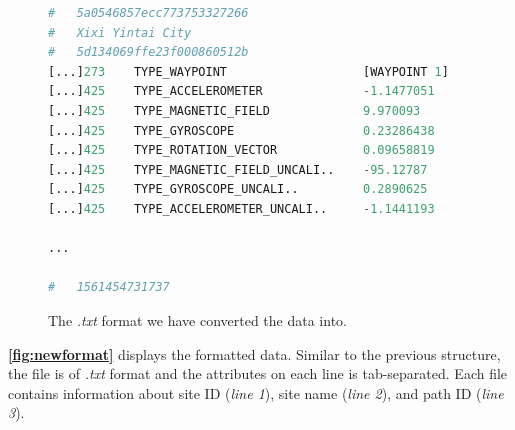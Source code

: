 
\begin{figure}[H]
\lstset{numbers=left}
\begin{lstlisting}[language=Python]
#	5a0546857ecc773753327266
#	Xixi Yintai City
#	5d134069ffe23f000860512b
[...]273    TYPE_WAYPOINT                   [WAYPOINT 1]	  [WAYPOINT 2]      ...
[...]425    TYPE_ACCELEROMETER	            -1.1477051      1.6084747	        ...
[...]425    TYPE_MAGNETIC_FIELD	            9.970093        31.666565	        ...
[...]425    TYPE_GYROSCOPE	                0.23286438      -0.18293762	      ...
[...]425    TYPE_ROTATION_VECTOR            0.09658819	    0.061834227       ...
[...]425    TYPE_MAGNETIC_FIELD_UNCALI..    -95.12787	      -39.694214        ...
[...]425    TYPE_GYROSCOPE_UNCALI..	        0.2890625	      -0.26670837       ...
[...]425    TYPE_ACCELEROMETER_UNCALI..	    -1.1441193	    1.7066345         ...

...

#	1561454731737
\end{lstlisting}
\caption{The \textit{.txt} format we have converted the data into.}
\label{fig:newformat}
\end{figure}

\textbf{\autoref{fig:newformat}} displays the formatted data. Similar to the previous structure, the file is of \textit{.txt} format and the attributes on each line is tab-separated. Each file contains information about site ID (\textit{line 1}), site name (\textit{line 2}), and path ID (\textit{line 3}).

